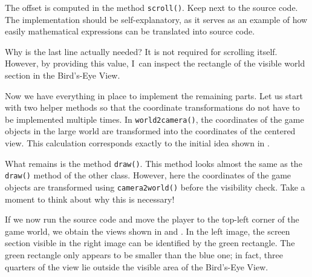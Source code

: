  

The offset is computed in the method \texttt{scroll()}. Keep  next to the source code.  The implementation should be self-explanatory, as it serves as an example of how easily mathematical expressions can be translated into source code.

Why is the last line actually needed? It is not required for scrolling itself. However, by providing this value, I~can inspect the rectangle of the visible world section in the Bird’s-Eye View.


Now we have everything in place to implement the remaining parts. Let us start with two helper methods so that the coordinate transformations do not have to be implemented multiple times. In \texttt{world2camera()}, the coordinates of the game objects in the large world are transformed into the coordinates of the centered view. This calculation corresponds exactly to the initial idea shown in .


What remains is the method \texttt{draw()}. This method looks almost the same as the \texttt{draw()} method of the other class. However, here the coordinates of the game objects are transformed using \texttt{camera2world()} before the visibility check. Take a moment to think about why this is necessary!


If we now run the source code and move the player to the top-left corner of the game world, we obtain the views shown in  and . In the left image, the screen section visible in the right image can be identified by the green rectangle. The green rectangle only appears to be smaller than the blue one; in fact, three quarters of the view lie outside the visible area of the Bird’s-Eye View.


